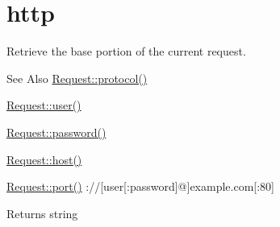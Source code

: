 \hypertarget{http-example}{\section{http}
}
Retrieve the base portion of the current request.

\begin{DoxySeeAlso}{See Also}
\hyperlink{class_request_a806349a06939db0150ce9d7d3e6f54f5}{Request\-::protocol()} 

\hyperlink{class_request_a512dd9b95abef2346ad3af2e593d10c1}{Request\-::user()} 

\hyperlink{class_request_a1ad0dec68fffe32c3b59e5130b63c1ba}{Request\-::password()} 

\hyperlink{class_request_a291eeae48e2675a5301279b0e1b8d8e2}{Request\-::host()} 

\hyperlink{class_request_a495e06b9d24638c678259b6f3aefbcd6}{Request\-::port()} \-://\mbox{[}user\mbox{[}\-:password\mbox{]}@\mbox{]}example.\-com\mbox{[}\-:80\mbox{]} 
\end{DoxySeeAlso}
\begin{DoxyReturn}{Returns}
string
\end{DoxyReturn}

\begin{DoxyCodeInclude}
\end{DoxyCodeInclude}
 
